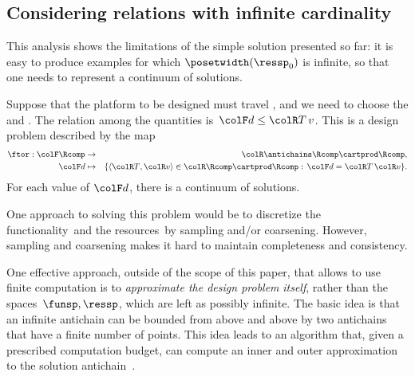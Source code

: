 \subsection{Considering relations with infinite cardinality}

This analysis shows the limitations of the simple solution presented so far: it is easy to produce examples for which $\posetwidth(\ressp_{0})$ is infinite, so that one needs to represent a continuum of solutions.

\begin{example}
    Suppose that the platform to be designed must travel , and we need to choose the  and .
    The relation among the quantities is~${\colF d}\leq{\colR T\,v}$.
    This is a design problem described by the map
    \begin{eqnarray*}
        \ftor:{\colF\Rcomp} & \rightarrow & {\colR\antichains\Rcomp\cartprod\Rcomp,}\\
        {\colF d} & \mapsto & \{\langle{\colR T},{\colR v}\rangle\in{\colR\Rcomp\cartprod\Rcomp}:\,{\colF d}={\colR T}\,{\colR v}\}.
    \end{eqnarray*}
    For each value of ${\colF d}$, there is a continuum of solutions.
\end{example}
One approach to solving this problem would be to discretize the functionality~\funsp and the resources~\ressp by sampling and/or coarsening.
However, sampling and coarsening makes it hard to maintain completeness and consistency.

One effective approach, outside of the scope of this paper, that allows to use finite computation is to \emph{approximate the design problem} \emph{itself}, rather than the spaces~$\funsp,\ressp$, which are left as possibly infinite.
The basic idea is that an infinite antichain can be bounded from above and above by two antichains that have a finite number of points.
This idea leads to an algorithm that, given a prescribed computation budget, can compute an inner and outer approximation to the solution antichain~\cite{mcdp_icra_uncertainty_arxiv}.

